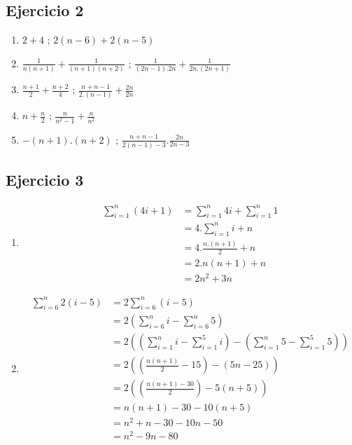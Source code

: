 \subsection{Ejercicio 2}
\begin{enumerate}[label=(\alph*)]
    \item $2+4$ ; $2(n-6)+ 2(n-5)$
    \item $\frac{1}{n(n+1)} + \frac{1}{(n+1)(n+2)}$ ; $\frac{1}{(2n-1).2n} + \frac{1}{2n.(2n+1)}$
    \item $\frac{n+1}{2} + \frac{n+2}{4}$ ; $\frac{n+n-1}{2.(n-1)} + \frac{2n}{2n}$
    \item $n + \frac{n}{2}$ ; $\frac{n}{n^2-1} + \frac{n}{n^2}$
    \item $-(n+1) . (n+2)$ ; $\frac{n+n-1}{2(n-1)-3} . \frac{2n}{2n-3}$
\end{enumerate}

\subsection{Ejercicio 3}
\begin{enumerate}[label=(\alph*)]
    \item \begin{align*}
        \sum_{i=1}^{n}(4i+1) &= \sum_{i=1}^{n}4i + \sum_{i=1}^{n} 1 \\
        &= 4 . \sum_{i=1}^{n}i + n \\
        &= 4 . \frac{n.(n+1)}{2} + n \\
        &= 2 . n(n+1) + n \\
        &= 2n^2 + 3n
    \end{align*}
    \item \begin{align*}
        \sum_{i=6}^{n}2(i-5) &= 2\sum_{i=6}^{n}(i-5)\\
        &= 2\left( \sum_{i=6}^{n}i -\sum_{i=6}^{n}5 \right) \\
        &= 2\left( \left(\sum_{i=1}^{n}i - \sum_{i=1}^{5}i\right) -\left(\sum_{i=1}^{n}5 - \sum_{i=1}^{5}5\right) \right) \\
        &= 2\left( \left(\frac{n(n+1)}{2} - 15 \right) -\left(5n - 25 \right)\right) \\
        &= 2\left( \left(\frac{n(n+1) - 30}{2} \right) - 5(n+5)\right) \\
        &= n(n+1) - 30 - 10(n+5) \\ 
        &= n^2 + n - 30 - 10n-50 \\
        &= n^2 - 9n-80 \\
    \end{align*}
\end{enumerate}

